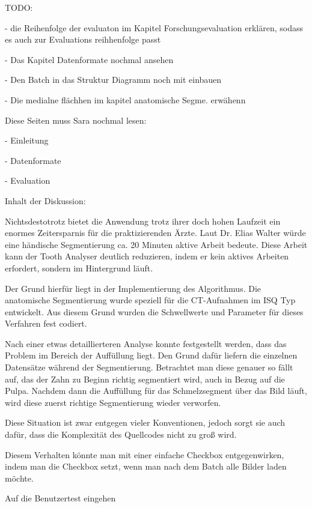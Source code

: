 TODO:

- die Reihenfolge der evaluaton im Kapitel Forschungsevaluation erklären, sodass
es auch zur Evaluations reihhenfolge passt

- Das Kapitel Datenformate nochmal ansehen

- Den Batch in das Struktur Diagramm noch mit einbauen

- Die medialne flächhen im kapitel anatomische Segme. erwähenn 

Diese Seiten muss Sara nochmal lesen:

- Einleitung

- Datenformate

- Evaluation


Inhalt der Diskussion:

Nichtsdestotrotz bietet die Anwendung trotz ihrer doch hohen Laufzeit ein enormes
Zeitersparnis für die praktizierenden Ärzte. Laut Dr. Elias Walter würde eine händische
Segmentierung ca. 20 Minuten aktive Arbeit bedeute. Diese Arbeit kann der Tooth Analyser
deutlich reduzieren, indem er kein aktives Arbeiten erfordert, sondern im Hintergrund
läuft.

Der Grund hierfür liegt in der Implementierung des Algorithmus. Die anatomische
Segmentierung wurde speziell für die \ac{CT}-Aufnahmen im \ac{ISQ} Typ
entwickelt. Aus diesem Grund wurden die Schwellwerte und Parameter für dieses Verfahren
fest codiert.

Nach einer etwas detaillierteren Analyse konnte festgestellt werden, dass das
Problem im Bereich der Auffüllung liegt. Den Grund dafür liefern die einzelnen Datensätze
während der Segmentierung. Betrachtet man diese genauer so fällt auf, das der Zahn
zu Beginn richtig segmentiert wird, auch in Bezug auf die Pulpa. Nachdem dann die
Auffüllung für das Schmelzsegment über das Bild läuft, wird diese zuerst
richtige Segmentierung wieder verworfen.

Diese Situation ist zwar entgegen vieler Konventionen, jedoch sorgt sie auch dafür,
dass die Komplexität des Quellcodes nicht zu groß wird.

Diesem Verhalten könnte man mit einer einfache Checkbox entgegenwirken, indem man
die Checkbox setzt, wenn man nach dem Batch alle Bilder laden möchte.

Auf die Benutzertest eingehen